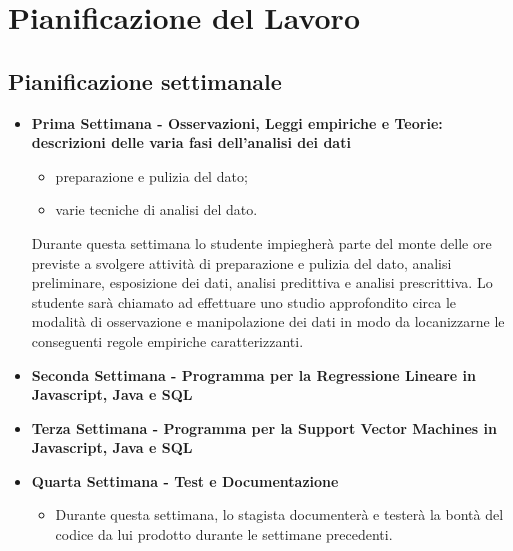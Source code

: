 \section{Pianificazione del Lavoro}
\subsection{Pianificazione settimanale}
\begin{itemize}
\item \textbf{Prima Settimana - Osservazioni, Leggi empiriche e Teorie: descrizioni delle varia fasi dell’analisi dei dati}
	\begin{itemize}
	\item preparazione e pulizia del dato;
	\item varie tecniche di analisi del dato.
	\end{itemize}

	Durante questa settimana lo studente impiegherà parte del monte delle ore previste a svolgere attività di preparazione e pulizia del dato, analisi preliminare, esposizione dei dati, analisi predittiva e analisi prescrittiva. Lo studente sarà
chiamato ad effettuare uno studio approfondito circa le modalità di osservazione e manipolazione dei dati in modo da locanizzarne le conseguenti regole empiriche caratterizzanti.

\item \textbf{Seconda Settimana - Programma per la Regressione Lineare in Javascript, Java e SQL}

\item \textbf{Terza Settimana - Programma per la Support Vector Machines in Javascript, Java e SQL}


\item \textbf{Quarta Settimana - Test e Documentazione}
	\begin{itemize}
	\item Durante questa settimana, lo stagista documenterà e testerà la bontà del codice da lui prodotto durante le settimane precedenti.
	\end{itemize}





\end{itemize}